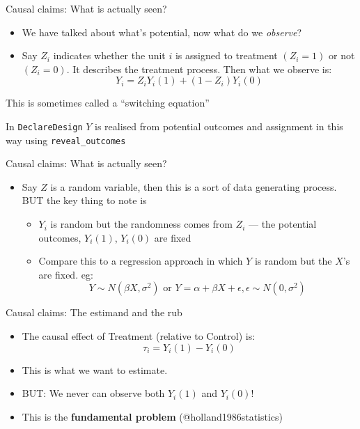 \documentclass[
  11pt,
  ignorenonframetext,
]{beamer}
\providecommand{\tightlist}{%
  \setlength{\itemsep}{0pt}\setlength{\parskip}{0pt}}\usepackage{longtable,booktabs,array}
\begin{document}
\begin{frame}[fragile]{Causal claims: What is actually seen?}
\protect\hypertarget{causal-claims-what-is-actually-seen}{}
\begin{itemize}
\tightlist
\item
  We have talked about what's potential, now what do we \emph{observe}?
\item
  Say \(Z_i\) indicates whether the unit \(i\) is assigned to treatment
  \((Z_i=1)\) or not \((Z_i=0)\). It describes the treatment process.
  Then what we observe is: \[ Y_i = Z_iY_i(1) + (1-Z_i)Y_i(0) \]
\end{itemize}

This is sometimes called a ``switching equation''

In \texttt{DeclareDesign} \(Y\) is realised from potential outcomes and
assignment in this way using \texttt{reveal\_outcomes}
\end{frame}

\begin{frame}{Causal claims: What is actually seen?}
\protect\hypertarget{causal-claims-what-is-actually-seen-1}{}
\begin{itemize}
\item
  Say \(Z\) is a random variable, then this is a sort of data generating
  process. BUT the key thing to note is

  \begin{itemize}
  \tightlist
  \item
    \(Y_i\) is random but the randomness comes from \(Z_i\) --- the
    potential outcomes, \(Y_i(1)\), \(Y_i(0)\) are fixed
  \item
    Compare this to a regression approach in which \(Y\) is random but
    the \(X\)'s are fixed. eg:
    \[ Y \sim N(\beta X, \sigma^2) \text{ or }  Y=\alpha+\beta X+\epsilon, \epsilon\sim N(0, \sigma^2) \]
  \end{itemize}
\end{itemize}
\end{frame}

\begin{frame}{Causal claims: The estimand and the rub}
\protect\hypertarget{causal-claims-the-estimand-and-the-rub}{}
\begin{itemize}
\tightlist
\item
  The causal effect of Treatment (relative to Control) is:
  \[\tau_i = Y_i(1) - Y_i(0)\]
\item
  This is what we want to estimate.
\item
  BUT: We never can observe both \(Y_i(1)\) and \(Y_i(0)\)!
\item
  This is the \textbf{fundamental problem} (@holland1986statistics)
\end{itemize}
\end{frame}
\end{document}
